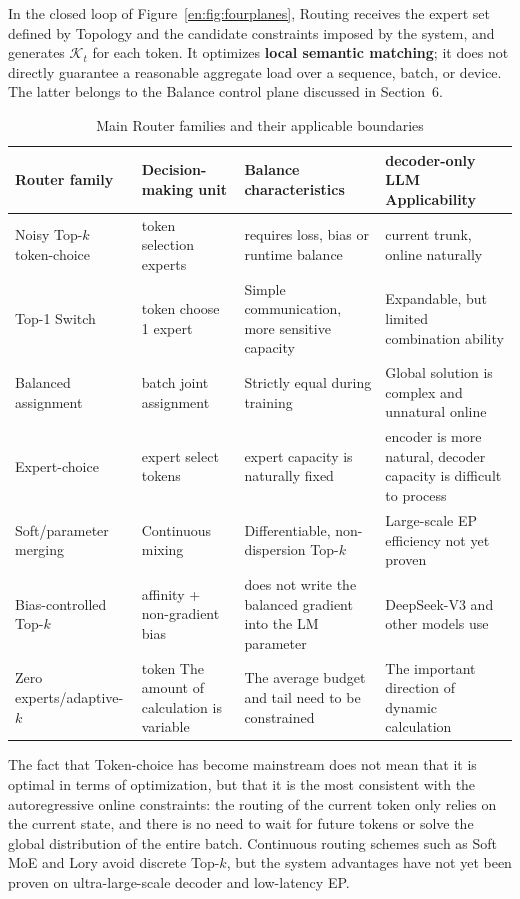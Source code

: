 \documentclass[10pt,a4paper,fontset=none]{ctexart}
\newcommand{\term}[1]{\textbf{#1}}
\begin{document}
In the closed loop of Figure~\ref{en:fig:fourplanes}, Routing receives the expert set defined by Topology and the candidate constraints imposed by the system, and generates $\mathcal{K}_t$ for each token. It optimizes \term{local semantic matching}; it does not directly guarantee a reasonable aggregate load over a sequence, batch, or device. The latter belongs to the Balance control plane discussed in Section~6.

\begin{table}[htbp]
\centering
\caption{Main Router families and their applicable boundaries}
\label{en:tab:router}
\small
\begin{tabularx}{\textwidth}{p{}p{}Y Y}
\toprule
Router family & Decision-making unit & Balance characteristics & decoder-only LLM Applicability \\
\midrule
Noisy Top-$k$ token-choice & token selection experts & requires loss, bias or runtime balance & current trunk, online naturally \\
Top-1 Switch & token choose 1 expert & Simple communication, more sensitive capacity & Expandable, but limited combination ability \\
Balanced assignment & batch joint assignment & Strictly equal during training & Global solution is complex and unnatural online \\
Expert-choice & expert select tokens & expert capacity is naturally fixed & encoder is more natural, decoder capacity is difficult to process \\
Soft/parameter merging & Continuous mixing & Differentiable, non-dispersion Top-$k$ & Large-scale EP efficiency not yet proven \\
Bias-controlled Top-$k$ & affinity + non-gradient bias & does not write the balanced gradient into the LM parameter & DeepSeek-V3 and other models use \\
Zero experts/adaptive-$k$ & token The amount of calculation is variable & The average budget and tail need to be constrained & The important direction of dynamic calculation \\
\bottomrule
\end{tabularx}
\end{table}

The fact that Token-choice has become mainstream does not mean that it is optimal in terms of optimization, but that it is the most consistent with the autoregressive online constraints: the routing of the current token only relies on the current state, and there is no need to wait for future tokens or solve the global distribution of the entire batch. Continuous routing schemes such as Soft MoE and Lory avoid discrete Top-$k$, but the system advantages have not yet been proven on ultra-large-scale decoder and low-latency EP\cite{en:puigcerver2023softmoe,en:zhong2024lory}.
\end{document}
